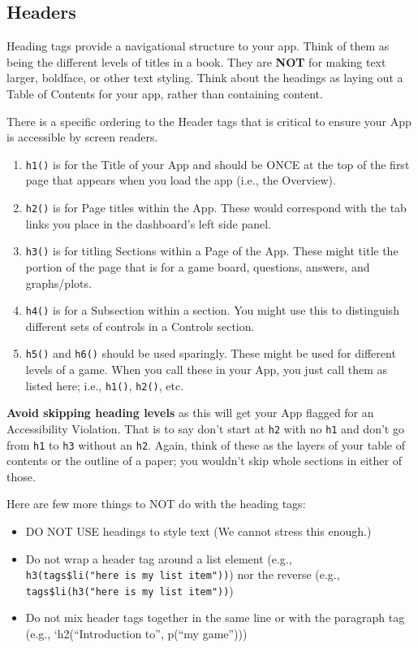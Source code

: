 \documentclass[
]{book}
\providecommand{\tightlist}{%
  \setlength{\itemsep}{0pt}\setlength{\parskip}{0pt}}
\begin{document}
\hypertarget{headers}{%
\subsection{Headers}\label{headers}}

Heading tags provide a navigational structure to your app. Think of them as being the different levels of titles in a book. They are \textbf{NOT} for making text larger, boldface, or other text styling. Think about the headings as laying out a Table of Contents for your app, rather than containing content.

There is a specific ordering to the Header tags that is critical to ensure your App is accessible by screen readers.

\begin{enumerate}
\def\labelenumi{\arabic{enumi}.}
\tightlist
\item
  \texttt{h1()} is for the Title of your App and should be ONCE at the top of the first page that appears when you load the app (i.e., the Overview).
\item
  \texttt{h2()} is for Page titles within the App. These would correspond with the tab links you place in the dashboard's left side panel.
\item
  \texttt{h3()} is for titling Sections within a Page of the App. These might title the portion of the page that is for a game board, questions, answers, and graphs/plots.
\item
  \texttt{h4()} is for a Subsection within a section. You might use this to distinguish different sets of controls in a Controls section.
\item
  \texttt{h5()} and \texttt{h6()} should be used sparingly. These might be used for different levels of a game. When you call these in your App, you just call them as listed here; i.e., \texttt{h1()}, \texttt{h2()}, etc.
\end{enumerate}

\textbf{Avoid skipping heading levels} as this will get your App flagged for an Accessibility Violation. That is to say don't start at \texttt{h2} with no \texttt{h1} and don't go from \texttt{h1} to \texttt{h3} without an \texttt{h2}. Again, think of these as the layers of your table of contents or the outline of a paper; you wouldn't skip whole sections in either of those.

Here are few more things to NOT do with the heading tags:

\begin{itemize}
\tightlist
\item
  DO NOT USE headings to style text (We cannot stress this enough.)
\item
  Do not wrap a header tag around a list element (e.g., \texttt{h3(tags\$li("here\ is\ my\ list\ item"))}) nor the reverse (e.g., \texttt{tags\$li(h3("here\ is\ my\ list\ item"))})
\item
  Do not mix header tags together in the same line or with the paragraph tag (e.g., `h2(``Introduction to'', p(``my game'')))
\end{itemize}
\end{document}
